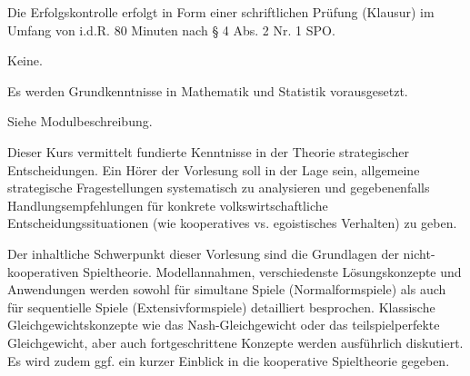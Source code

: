 \begin{course}

\setdoclanguagegerman
{}



\coursehead


\label{cour_4649.dp_997}


\begin{styleenv}
\begin{assessment}
Die Erfolgskontrolle erfolgt in Form einer schriftlichen Prüfung (Klausur) im Umfang von i.d.R. 80 Minuten nach § 4 Abs. 2 Nr. 1 SPO.


\end{assessment}

\begin{conditions}Keine.\end{conditions}

\begin{recommendations}Es werden Grundkenntnisse in Mathematik und Statistik vorausgesetzt.

 

Siehe Modulbeschreibung.

\end{recommendations}
\end{styleenv}

\begin{learningoutcomes}
Dieser Kurs vermittelt fundierte Kenntnisse in der Theorie strategischer Entscheidungen. Ein Hörer der Vorlesung soll in der Lage sein, allgemeine strategische Fragestellungen systematisch zu analysieren und gegebenenfalls Handlungsempfehlungen für konkrete volkswirtschaftliche Entscheidungssituationen (wie kooperatives vs. egoistisches Verhalten) zu geben.


\end{learningoutcomes}

\begin{content}
Der inhaltliche Schwerpunkt dieser Vorlesung sind die Grundlagen der nicht-kooperativen Spieltheorie. Modellannahmen, verschiedenste Lösungskonzepte und Anwendungen werden sowohl für simultane Spiele (Normalformspiele) als auch für sequentielle Spiele (Extensivformspiele) detailliert besprochen. Klassische Gleichgewichtskonzepte wie das Nash-Gleichgewicht oder das teilspielperfekte Gleichgewicht, aber auch fortgeschrittene Konzepte werden ausführlich diskutiert. Es wird zudem ggf. ein kurzer Einblick in die kooperative Spieltheorie gegeben.



\end{content}
\end{course}
